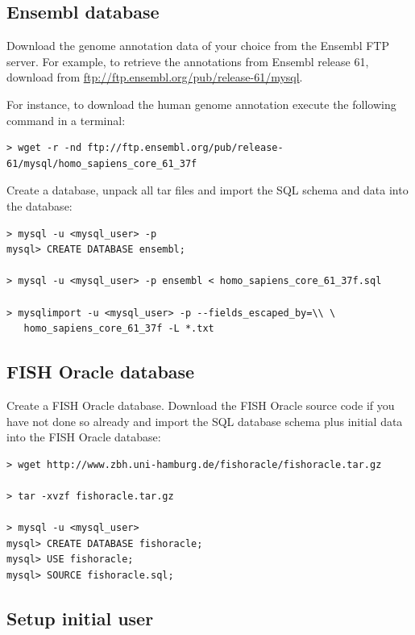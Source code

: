 \documentclass[11pt,final]{article}
\begin{document}
\subsection{Ensembl database}

Download the genome annotation data of your choice from the Ensembl FTP server.
For example, to retrieve the annotations from Ensembl release 61, download from
\url{ftp://ftp.ensembl.org/pub/release-61/mysql}.

For instance, to download the human genome annotation execute the following
command in a terminal:

\begin{lstlisting}
> wget -r -nd ftp://ftp.ensembl.org/pub/release-61/mysql/homo_sapiens_core_61_37f
\end{lstlisting}

Create a database, unpack all tar files and import the SQL schema and data
into the database:

\begin{lstlisting}
> mysql -u <mysql_user> -p
mysql> CREATE DATABASE ensembl;

> mysql -u <mysql_user> -p ensembl < homo_sapiens_core_61_37f.sql

> mysqlimport -u <mysql_user> -p --fields_escaped_by=\\ \
   homo_sapiens_core_61_37f -L *.txt
\end{lstlisting}

\subsection{FISH Oracle database}

Create a FISH Oracle database. Download the FISH Oracle source code if you
have not done so already and import the SQL database schema plus initial
data into the FISH Oracle database:

\begin{lstlisting}
> wget http://www.zbh.uni-hamburg.de/fishoracle/fishoracle.tar.gz

> tar -xvzf fishoracle.tar.gz

> mysql -u <mysql_user>
mysql> CREATE DATABASE fishoracle;
mysql> USE fishoracle;
mysql> SOURCE fishoracle.sql;
\end{lstlisting}

\subsection{Setup initial user}
\end{document}
